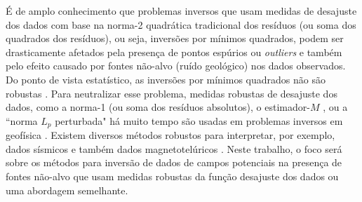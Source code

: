 É de amplo conhecimento que problemas inversos que usam medidas de desajuste dos dados com base na norma-2 quadrática tradicional dos resíduos (ou soma dos quadrados dos resíduos), ou seja, inversões por mínimos quadrados, podem ser drasticamente afetados pela presença de pontos espúrios ou \textit{outliers} e também pelo efeito causado por fontes não-alvo (ruído geológico) nos dados observados.
Do ponto de vista estatístico, as inversões por mínimos quadrados não são robustas \citep{huber1964, scales_gersztenkorn1988}.
Para neutralizar esse problema, medidas robustas de desajuste dos dados, como a norma-1 (ou soma dos resíduos absolutos), o estimador-$ M $ \citep{huber1964}, ou a ``norma $ L_ {p} $ perturbada" \citep{ekblom1973} há muito tempo são usadas em problemas inversos em geofísica \citep{farquharson_oldenburg1998}.
Existem diversos métodos robustos para interpretar, por exemplo, dados sísmicos \citep[por exemplo,][]{claerbout_muir1973, scales_gersztenkorn1988, crase_etal1990, amundsen1991, guitton_symes2003, ji2012, dasilva2020} e também dados magnetotelúricos \citep[por exemplo,][]{egbert_booker1986, chave_etal1987, sutarno_vozoff1991, larsen_etal1996, matsuno_etal2014}.
Neste trabalho, o foco será sobre os métodos para inversão de dados de campos potenciais na presença de fontes não-alvo que usam medidas robustas da função desajuste dos dados ou uma abordagem semelhante.

